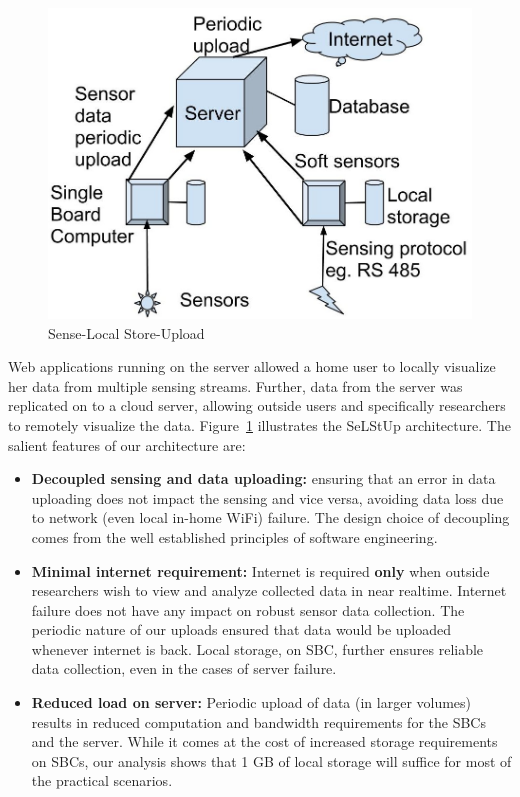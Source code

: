 \documentclass[10pt]{sensys-proc}
\newcommand{\figref}[1]{Figure~\ref{#1}}
\newcommand{\paradigm}{Sense-Local Store-Upload}
\newcommand{\selstups}{SeLStUp }
\begin{document}
\begin{figure} 
\vspace{-4mm}    
    \centering \includegraphics[scale=0.13]{./figures/architecture.jpg}  
    \vspace{-2mm}  
    \caption{\paradigm}   
    \label{fig:architecture}   
\end{figure}



Web applications running on the server allowed a home user to locally visualize her data from multiple sensing streams. Further, data from the server was replicated on to a cloud server, allowing outside users and specifically researchers to remotely visualize the data. \figref{fig:architecture} illustrates the \selstups architecture. The salient features of our architecture are:

\begin{itemize}
\item \textbf{Decoupled sensing and data uploading:} ensuring that an error in data uploading does not impact the sensing and vice versa, avoiding data loss due to network (even local in-home WiFi) failure. The design choice of decoupling comes from the well established principles of software engineering.
\item \textbf{Minimal internet requirement:} Internet is required \textbf{only} when outside researchers wish to view and analyze collected data in near realtime. Internet failure does not have any impact on robust sensor data collection. The periodic nature of our uploads ensured that data would be uploaded whenever internet is back. Local storage, on SBC, further ensures reliable data collection, even in the cases of server failure. %
\item \textbf{Reduced load on server:} Periodic upload of data (in larger volumes) results in reduced computation and bandwidth requirements for the SBCs and the server. While it comes at the cost of increased storage requirements on SBCs, our analysis shows that 1 GB of local storage will suffice for most of the practical scenarios. %
\end{itemize}
\end{document}
